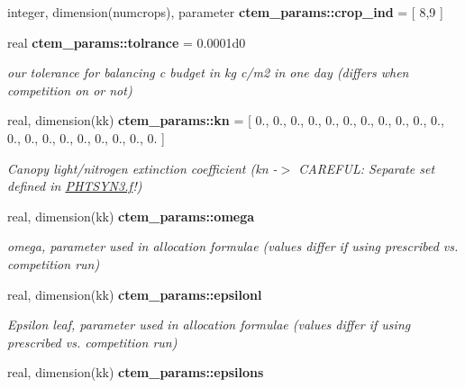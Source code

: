 \begin{DoxyCompactItemize}
\item 
\hypertarget{namespacectem__params_acc6cbb656e34f04ef6d29df9e3418bb3}{}integer, dimension(numcrops), parameter {\bfseries ctem\+\_\+params\+::crop\+\_\+ind} = \mbox{[} 8,9 \mbox{]}\label{namespacectem__params_acc6cbb656e34f04ef6d29df9e3418bb3}

\item 
\hypertarget{namespacectem__params_a0556fbcb62b10a6e390157c628d227d1}{}real {\bfseries ctem\+\_\+params\+::tolrance} = 0.\+0001d0\label{namespacectem__params_a0556fbcb62b10a6e390157c628d227d1}

\begin{DoxyCompactList}\small\item\em our tolerance for balancing c budget in kg c/m2 in one day (differs when competition on or not) \end{DoxyCompactList}\item 
\hypertarget{namespacectem__params_a3a1fb11af516cf3daa780402bdbde953}{}real, dimension(kk) {\bfseries ctem\+\_\+params\+::kn} = \mbox{[} 0., 0., 0., 0., 0., 0., 0., 0., 0., 0., 0., 0., 0., 0., 0., 0., 0., 0., 0., 0. \mbox{]}\label{namespacectem__params_a3a1fb11af516cf3daa780402bdbde953}

\begin{DoxyCompactList}\small\item\em Canopy light/nitrogen extinction coefficient (kn -\/$>$ C\+A\+R\+E\+F\+U\+L\+: Separate set defined in \hyperlink{PHTSYN3_8f}{P\+H\+T\+S\+Y\+N3.\+f}!) \end{DoxyCompactList}\item 
\hypertarget{namespacectem__params_a632738827e870757c4538eb8abd3ba18}{}real, dimension(kk) {\bfseries ctem\+\_\+params\+::omega}\label{namespacectem__params_a632738827e870757c4538eb8abd3ba18}

\begin{DoxyCompactList}\small\item\em omega, parameter used in allocation formulae (values differ if using prescribed vs. competition run) \end{DoxyCompactList}\item 
\hypertarget{namespacectem__params_a555429920f02dff7239a96256af1a0eb}{}real, dimension(kk) {\bfseries ctem\+\_\+params\+::epsilonl}\label{namespacectem__params_a555429920f02dff7239a96256af1a0eb}

\begin{DoxyCompactList}\small\item\em Epsilon leaf, parameter used in allocation formulae (values differ if using prescribed vs. competition run) \end{DoxyCompactList}\item 
\hypertarget{namespacectem__params_ae5c289e0db08b110ab093ab912b1955b}{}real, dimension(kk) {\bfseries ctem\+\_\+params\+::epsilons}\label{namespacectem__params_ae5c289e0db08b110ab093ab912b1955b}


\end{DoxyCompactItemize}
